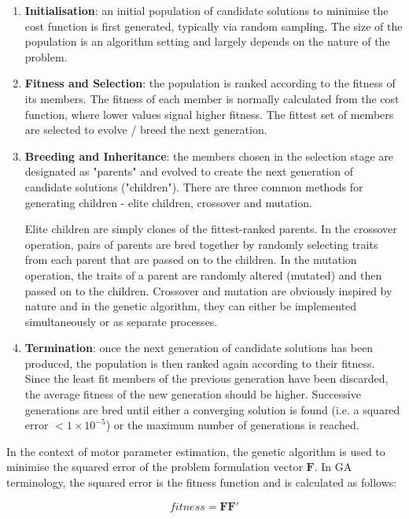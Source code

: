 \documentclass{article}
\begin{document}
\begin{enumerate}
\item \textbf{Initialisation}: an initial population of candidate solutions to minimise the cost function is first generated, typically via random sampling. The size of the population is an algorithm setting and largely depends on the nature of the problem.

\item \textbf{Fitness and Selection}: the population is ranked according to the fitness of its members. The fitness of each member is normally calculated from the cost function, where lower values signal higher fitness. The fittest set of members are selected to evolve / breed the next generation.

\item \textbf{Breeding and Inheritance}: the members chosen in the selection stage are designated as "parents" and evolved to create the next generation of candidate solutions ("children"). There are three common methods for generating children - elite children, crossover and mutation.

Elite children are simply clones of the fittest-ranked parents. In the crossover operation, pairs of parents are bred together by randomly selecting traits from each parent that are passed on to the children. In the mutation operation, the traits of a parent are randomly altered (mutated) and then passed on to the children. Crossover and mutation are obviously inspired by nature and in the genetic algorithm, they can either be implemented simultaneously or as separate processes.

\item \textbf{Termination}: once the next generation of candidate solutions has been produced, the population is then ranked again according to their fitness. Since the least fit members of the previous generation have been discarded, the average fitness of the new generation should be higher. Successive generations are bred until either a converging solution is found (i.e. a squared error $<1 \times 10^{-5}$) or the maximum number of generations is reached.

\end{enumerate}

In the context of motor parameter estimation, the genetic algorithm is used to minimise the squared error of the problem formulation vector $\mathbf{F}$. In GA terminology, the squared error is the fitness function and is calculated as follows:

\begin{equation}
fitness = \mathbf{F} \mathbf{F}'
\end{equation}
\end{document}
